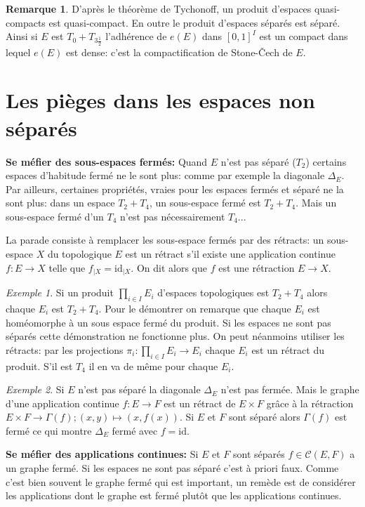 \documentclass[a4paper, 11pt, french]{book}
\theoremstyle{plain} %
\theoremstyle{definition} %
\newtheorem{remarque}{Remarque}
\theoremstyle{remark} %
\newtheorem{exemple}{Exemple}
\newcommand{\1}{\mathds{1}}
\newcommand{\id}{\mathrm{id}}
\newcommand{\cont}{\mathcal{C}}
\begin{document}
\begin{remarque}
	D'après le théorème de Tychonoff, un produit d'espaces quasi-compacts est quasi-compact.
	En outre le produit d'espaces séparés est séparé.
	Ainsi si $E$ est $T_0+T_{3\frac{1}{2}}$ l'adhérence de $e(E)$ dans $[0, 1]^I$ est un compact dans lequel $e(E)$ est dense: c'est la compactification de Stone-Čech de $E$.
\end{remarque}


\section{Les pièges dans les espaces non séparés}

\textbf{Se méfier des sous-espaces fermés:}
Quand $E$ n'est pas séparé ($T_2$) certains espaces d'habitude fermé ne le sont plus: comme par exemple la diagonale $\Delta_E$.
Par ailleurs, certaines propriétés, vraies pour les espaces fermés et séparé ne la sont plus: dans un espace $T_2+T_4$, un sous-espace fermé est $T_2+T_4$.
Mais un sous-espace fermé d'un $T_4$ n'est pas nécessairement $T_4$...

La parade consiste à remplacer les sous-espace fermés par des rétracts: un sous-espace $X$ du topologique $E$ est un rétract s'il existe une application continue $f:E\rightarrow X$ telle que $f_{\vert X}=\id_{\vert X}$.
On dit alors que $f$ est une rétraction $E\rightarrow X$.

\begin{exemple}
	Si un produit $\prod_{i\in I}E_i$ d'espaces topologiques est $T_2+T_4$ alors chaque $E_i$ est $T_2+T_4$.
	Pour le démontrer on remarque que chaque $E_i$ est homéomorphe à un sous espace fermé du produit.
	Si les espaces ne sont pas séparés cette démonstration ne fonctionne plus.
	On peut néanmoins utiliser les rétracts: par les projections $\pi_i:\prod_{i\in I}E_i\rightarrow E_i$ chaque $E_i$ est un rétract du produit.
	S'il est $T_4$ il en va de même pour chaque $E_i$.
\end{exemple}


\begin{exemple}
	Si $E$ n'est pas séparé la diagonale $\Delta_E$ n'est pas fermée.
	Mais le graphe d'une application continue $f:E\rightarrow F$ est un rétract de $E\times F$ grâce à la rétraction $E\times F\rightarrow\Gamma(f); (x, y)\mapsto(x, f(x))$.
	Si $E$ et $F$ sont séparé alors $\Gamma(f)$ est fermé ce qui montre $\Delta_E$ fermé avec $f=\id$.
\end{exemple}

\textbf{Se méfier des applications continues:}
Si $E$ et $F$ sont séparés $f\in\cont(E, F)$ a un graphe fermé.
Si les espaces ne sont pas séparé c'est à priori faux.
Comme c'est bien souvent le graphe fermé qui est important, un remède est de considérer les applications dont le graphe est fermé plutôt que les applications continues.
\end{document}

